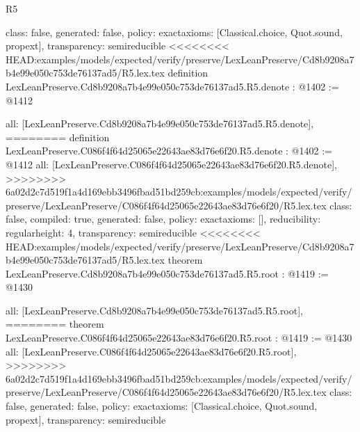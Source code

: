 \begin{lexlean}{R5}
\begin{coremodule}
{{{{{{{{{{{{  class: false,
  generated: false,
  policy: exact{axioms: [Classical.choice, Quot.sound, propext]},
  transparency: semireducible
}
<<<<<<<< HEAD:examples/models/expected/verify/preserve/LexLeanPreserve/Cd8b9208a7b4e99e050c753de76137ad5/R5.lex.tex
definition LexLeanPreserve.Cd8b9208a7b4e99e050c753de76137ad5.R5.denote : @1402 := @1412 {
  all: [LexLeanPreserve.Cd8b9208a7b4e99e050c753de76137ad5.R5.denote],
========
definition LexLeanPreserve.C086f4f64d25065e22643ae83d76e6f20.R5.denote : @1402 := @1412 {
  all: [LexLeanPreserve.C086f4f64d25065e22643ae83d76e6f20.R5.denote],
>>>>>>>> 6a02d2c7d519f1a4d169ebb3496fbad51bd259cb:examples/models/expected/verify/preserve/LexLeanPreserve/C086f4f64d25065e22643ae83d76e6f20/R5.lex.tex
  class: false,
  compiled: true,
  generated: false,
  policy: exact{axioms: []},
  reducibility: regular{height: 4},
  transparency: semireducible
}
<<<<<<<< HEAD:examples/models/expected/verify/preserve/LexLeanPreserve/Cd8b9208a7b4e99e050c753de76137ad5/R5.lex.tex
theorem LexLeanPreserve.Cd8b9208a7b4e99e050c753de76137ad5.R5.root : @1419 := @1430 {
  all: [LexLeanPreserve.Cd8b9208a7b4e99e050c753de76137ad5.R5.root],
========
theorem LexLeanPreserve.C086f4f64d25065e22643ae83d76e6f20.R5.root : @1419 := @1430 {
  all: [LexLeanPreserve.C086f4f64d25065e22643ae83d76e6f20.R5.root],
>>>>>>>> 6a02d2c7d519f1a4d169ebb3496fbad51bd259cb:examples/models/expected/verify/preserve/LexLeanPreserve/C086f4f64d25065e22643ae83d76e6f20/R5.lex.tex
  class: false,
  generated: false,
  policy: exact{axioms: [Classical.choice, Quot.sound, propext]},
  transparency: semireducible
}

}}}}}}}}}}}}}
\end{coremodule}
\end{lexlean}
